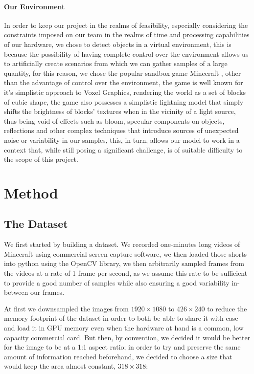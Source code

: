 \documentclass[10pt,journal,cspaper,compsoc]{IEEEtran}
\begin{document}
    \paragraph*{Our Environment}
    In order to keep our project in the realms of feasibility, especially considering the constraints imposed on our team in the 
    realms of time and processing capabilities of our hardware, we chose to detect objects in a virtual environment, this is because 
    the possibility of having complete control over the environment allows us to artificially create scenarios from which we can gather 
    samples of a large quantity, for this reason, we chose the popular sandbox game Minecraft \cite{Mojang-Minecraft}, other than 
    the advantage of control over the environment, the game is well known for it's simplistic approach to Voxel Graphics, rendering 
    the world as a set of blocks of cubic shape, the game also possesses a simplistic lightning model that simply shifts the brightness
    of blocks' textures when in the vicinity of a light source, thus being void of effects such as bloom, specular components on objects,
    reflections and other complex techniques that introduce sources of unexpected noise or variability in our samples, this, in turn, 
    allows our model to work in a context that, while still posing a significant challenge, is of suitable difficulty to the scope of 
    this project.



 \section{Method}   
    \subsection{The Dataset}
    We first started by building a dataset. We recorded one-minutes long videos of Minecraft using commercial screen capture software, we then loaded those shorts into python using the OpenCV library, we then arbitrarily sampled frames from the videos at a rate of 1 frame-per-second, as we assume this rate to be sufficient to provide a good number of samples while also ensuring a good variability in-between our frames. 

    At first we downsampled the images from $1920\times 1080$ to $426 \times 240$ to reduce the memory footprint of the dataset in order to both be able to share it with ease and load it in GPU memory even when the hardware at hand is a common, low capacity commercial card. But then, by convention, we decided it would be better for the image to be at a 1:1 aspect ratio; in order to try and preserve the same amount of information reached beforehand, we decided to choose a size that would keep the area almost constant, $318\times 318$:
\end{document}
